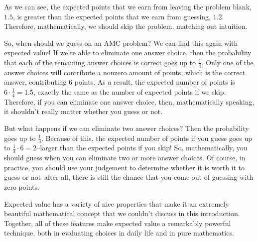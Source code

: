 \documentclass{article}
\begin{document}
As we can see, the expected points that we earn from leaving the problem blank, $1.5$, is greater than the expected points that we earn from guessing, $1.2$. Therefore, mathematically, we should skip the problem, matching out intuition.

So, when should we guess on an AMC problem? We can find this again with expected value! If we're able to eliminate one answer choice, then the probability that each of the remaining answer choices is correct goes up to $\frac{1}{4}$. Only one of the answer choices will contribute a nonzero amount of points, which is the correct answer, contributing $6$ points. As a result, the expected number of points is $6\cdot\frac{1}{4}=1.5$, exactly the same as the number of expected points if we skip. Therefore, if you can eliminate one answer choice, then, mathematically speaking, it shouldn't really matter whether you guess or not.

But what happens if we can eliminate two answer choices? Then the probability goes up to $\frac{1}{3}$. Because of this, the expected number of points if you guess goes up to $\frac{1}{3}\cdot 6=2$--larger than the expected points if you skip! So, mathematically, you should guess when you can eliminate two or more answer choices. Of course, in practice, you should use your judgement to determine whether it is worth it to guess or not--after all, there is still the chance that you come out of guessing with zero points.

Expected value has a variety of nice properties that make it an extremely beautiful mathematical concept that we couldn't discuss in this introduction. Together, all of these features make expected value a remarkably powerful technique, both in evaluating choices in daily life and in pure mathematics.
\end{document}

